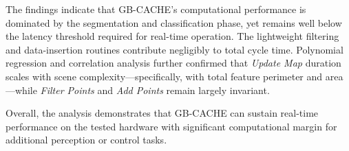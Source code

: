 \documentclass[../main.tex]{subfiles}
\begin{document}
The findings indicate that GB-CACHE’s computational performance is dominated by the segmentation and classification phase, yet remains well below the latency threshold required for real-time operation. 
The lightweight filtering and data-insertion routines contribute negligibly to total cycle time. 
Polynomial regression and correlation analysis further confirmed that \textit{Update Map} duration scales with scene complexity---specifically, with total feature perimeter and area---while \textit{Filter Points} and \textit{Add Points} remain largely invariant.

Overall, the analysis demonstrates that GB-CACHE can sustain real-time performance on the tested hardware with significant computational margin for additional perception or control tasks.
\end{document}
